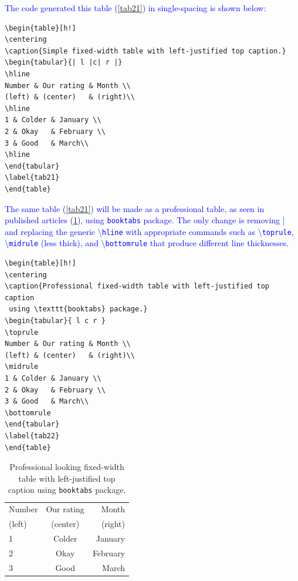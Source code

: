 \documentclass[phd,showframe]{ndsu-thesis-2022}
\newcommand\italk[1]{\textcolor{blue}{#1}}  %
\newcommand\cmd[1]{\textbackslash\texttt{#1}}  %
\begin{document}
\italk{The code generated this table (\cref{tab21}) in single-spacing is shown below:}

{\singlespacing
\begin{verbatim}
\begin{table}[h!]
\centering
\caption{Simple fixed-width table with left-justified top caption.}
\begin{tabular}{| l |c| r |}
\hline
Number & Our rating & Month \\
(left) & (center)   & (right)\\
\hline
1 & Colder & January \\
2 & Okay   & February \\
3 & Good   & March\\
\hline
\end{tabular}
\label{tab21}
\end{table}
\end{verbatim}
}

\italk{The same table (\cref{tab21}) will be made as a professional table, as seen in published articles (\cref{tab22}), using \texttt{booktabs} package. The only change is removing | and replacing the generic \cmd{hline} with appropriate commands such as \cmd{toprule}, \cmd{midrule} (less thick), and \cmd{bottomrule} that produce different line thicknesses.
}

{\singlespacing
\begin{verbatim}
\begin{table}[h!]
\centering
\caption{Professional fixed-width table with left-justified top caption
 using \texttt{booktabs} package.}
\begin{tabular}{ l c r }
\toprule
Number & Our rating & Month \\
(left) & (center)   & (right)\\
\midrule
1 & Colder & January \\
2 & Okay   & February \\
3 & Good   & March\\
\bottomrule
\end{tabular}
\label{tab22}
\end{table}
\end{verbatim}
}
\label{tabcode22}

\begin{table}[ht!]
\centering
\caption{Professional looking fixed-width table with left-justified top caption using \texttt{booktabs} package.}
\begin{tabular}{ l c r }
\toprule
Number & Our rating & Month \\
(left) & (center)   & (right)\\
\midrule
1 & Colder & January \\
2 & Okay   & February \\
3 & Good   & March\\
\bottomrule
\end{tabular}
\label{tab22}
\end{table}
\end{document}
